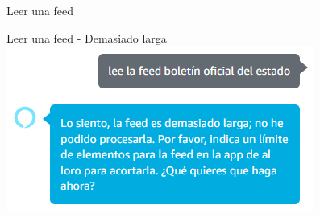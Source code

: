 \documentclass{beamer}
\begin{document}
\begin{frame}{Leer una feed}
  \end{frame}

  \begin{frame}{Leer una feed - Demasiado larga}
    \includegraphics[width=\textwidth]{feed-demasiado-larga.png}
  \end{frame}
\end{document}
